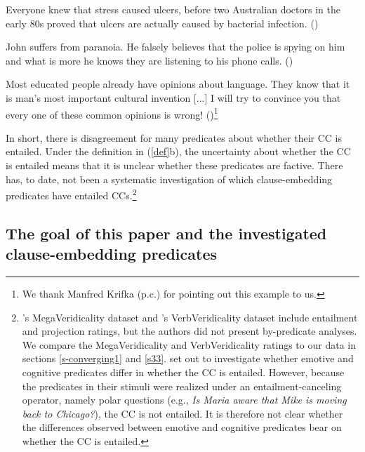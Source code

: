 \documentclass[11pt,fleqn]{article}
\newcommand{\6}{\mbox{$[\hspace*{-.6mm}[$}}
\newcommand{\9}{\mbox{$]\hspace*{-.6mm}]$}}
\newcommand{\citepos}[1]{\citeauthor{#1}'s \citeyear{#1}}
\begin{document}
\begin{exe}
\ex\label{know}
\begin{xlist}
\ex Everyone knew that stress caused ulcers, before two Australian doctors in the early 80s proved that ulcers are actually caused by bacterial infection. \hfill (\citealt[501]{hazlett2010})

\ex John suffers from paranoia. He falsely believes that the police is spying on him and what is more he knows they are listening to his phone calls. \hfill (\citealt[514]{abrusan2011})

\ex Most educated people already have opinions about language. They know that it is man's most important cultural invention [...] I will try to convince you that every one of these common opinions is wrong! \hfill (\citealt[17f.]{pinker94})\footnote{We thank Manfred Krifka (p.c.) for pointing out this example to us.}

\end{xlist}
\end{exe}

In short, there is disagreement for many predicates about whether their CC is entailed. Under the definition in (\ref{def}b), the uncertainty about whether the CC is entailed means that it is unclear whether these predicates are factive. There has, to date, not been a systematic investigation of which clause-embedding predicates have entailed CCs.\footnote{\citepos{white-rawlins-nels2018} MegaVeridicality dataset  and \citepos{ross-pavlick2019} VerbVeridicality dataset  include entailment and projection ratings, but the authors did not present by-predicate analyses. We compare the MegaVeridicality and VerbVeridicality ratings to our data in sections \ref{s-converging1} and  \ref{s33}. \citet{djaerv-etal2016} set out to investigate whether emotive and cognitive predicates differ in whether the CC is entailed. However, because the predicates in their stimuli were realized under an entailment-canceling operator, namely polar questions (e.g., {\em Is Maria aware that Mike is moving back to Chicago?}), the CC is not entailed. It is therefore not clear whether the differences observed between emotive and cognitive predicates bear on whether the CC is entailed.} 

\subsection{The goal of this paper and the investigated clause-embedding predicates}
\end{document}
